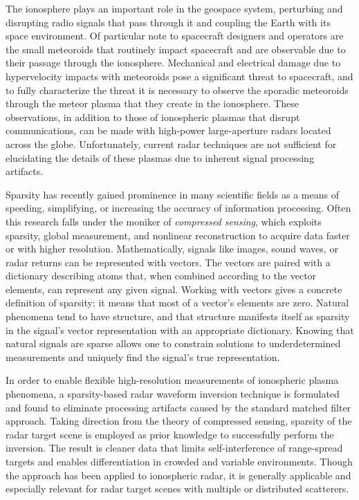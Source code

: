 The ionosphere plays an important role in the geospace system, perturbing and disrupting radio signals that pass through it and coupling the Earth with its space environment. Of particular note to spacecraft designers and operators are the small meteoroids that routinely impact spacecraft and are observable due to their passage through the ionosphere. Mechanical and electrical damage due to hypervelocity impacts with meteoroids pose a significant threat to spacecraft, and to fully characterize the threat it is necessary to observe the sporadic meteoroids through the meteor plasma that they create in the ionosphere. These observations, in addition to those of ionospheric plasmas that disrupt communications, can be made with high-power large-aperture radars located across the globe. Unfortunately, current radar techniques are not sufficient for elucidating the details of these plasmas due to inherent signal processing artifacts.

Sparsity has recently gained prominence in many scientific fields as a means of speeding, simplifying, or increasing the accuracy of information processing. Often this research falls under the moniker of \emph{compressed sensing}, which exploits sparsity, global measurement, and nonlinear reconstruction to acquire data faster or with higher resolution. Mathematically, signals like images, sound waves, or radar returns can be represented with vectors. The vectors are paired with a dictionary describing atoms that, when combined according to the vector elements, can represent any given signal. Working with vectors gives a concrete definition of sparsity; it means that most of a vector's elements are zero. Natural phenomena tend to have structure, and that structure manifests itself as sparsity in the signal's vector representation with an appropriate dictionary. Knowing that natural signals are sparse allows one to constrain solutions to underdetermined measurements and uniquely find the signal's true representation.

In order to enable flexible high-resolution measurements of ionospheric plasma phenomena, a sparsity-based radar waveform inversion technique is formulated and found to eliminate processing artifacts caused by the standard matched filter approach. Taking direction from the theory of compressed sensing, sparsity of the radar target scene is employed as prior knowledge to successfully perform the inversion. The result is cleaner data that limits self-interference of range-spread targets and enables differentiation in crowded and variable environments. Though the approach has been applied to ionospheric radar, it is generally applicable and especially relevant for radar target scenes with multiple or distributed scatterers.

